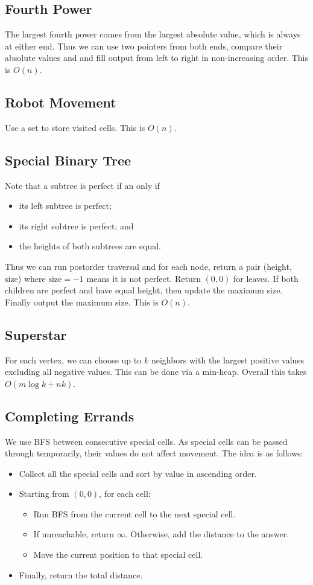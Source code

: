 \documentclass[12pt]{article}
\begin{document}
\subsection{Fourth Power}
The largest fourth power comes from the largest absolute value, which is always at either end. Thus we can use two pointers from both ends, compare their absolute values and and fill output from left to right in non-increasing order. This is $O(n)$.
\subsection{Robot Movement}
Use a set to store visited cells. This is $O(n)$.
\subsection{Special Binary Tree}
Note that a subtree is perfect if an only if
\begin{itemize}
    \item its left subtree is perfect;
    \item its right subtree is perfect; and
    \item the heights of both subtrees are equal.
\end{itemize}
Thus we can run postorder traversal and for each node, return a pair (height, size) where $\mathrm{size}=-1$ means it is not perfect. Return $(0,0)$ for leaves. If both children are perfect and have equal height, then update the maximum size. Finally output the maximum size. This is $O(n)$.
\subsection{Superstar}
For each vertex, we can choose up to $k$ neighbors with the largest positive values excluding all negative values. This can be done via a min-heap. Overall this takes $O(m\log k+nk)$.
\subsection{Completing Errands}
We use BFS between consecutive special cells. As special cells can be passed through temporarily, their values do not affect movement. The idea is as follows:
\begin{itemize}
    \item Collect all the special cells and sort by value in ascending order.
    \item Starting from $(0,0)$, for each cell:
    \begin{itemize}
        \item Run BFS from the current cell to the next special cell.
        \item If unreachable, return $\infty$. Otherwise, add the distance to the answer.
        \item Move the current position to that special cell.
    \end{itemize}
    \item Finally, return the total distance.
\end{itemize}
\end{document}
